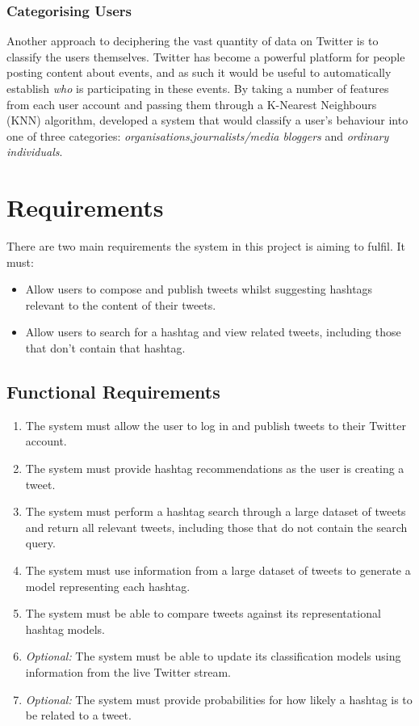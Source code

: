 \documentclass[12pt,a4paper]{article}
\begin{document}
\subsubsection{Categorising Users}
Another approach to deciphering the vast quantity of data on Twitter is to classify the users themselves. Twitter has become a powerful platform for people posting content about events, and as such it would be useful to automatically establish \emph{who} is participating in these events. By taking a number of features from each user account and passing them through a K-Nearest Neighbours (KNN) algorithm, \textcite{DeChoudhury:2012} developed a system that would classify a user's behaviour into one of three categories: \emph{organisations},\emph{journalists/media bloggers} and \emph{ordinary individuals}.

\pagebreak

\section{Requirements}
There are two main requirements the system in this project is aiming to fulfil. It must:
\begin{itemize}
    \item Allow users to compose and publish tweets whilst suggesting hashtags relevant to the content of their tweets.
    \item Allow users to search for a hashtag and view related tweets, including those that don't contain that hashtag.
\end{itemize}

\subsection{Functional Requirements}
\begin{enumerate}
    \item \label{func:publish} The system must allow the user to log in and publish tweets to their Twitter account.
    \item \label{func:suggest} The system must provide hashtag recommendations as the user is creating a tweet.
    \item \label{func:search} The system must perform a hashtag search through a large dataset of tweets and return all relevant tweets, including those that do not contain the search query.
    \item \label{func:genmodel} The system must use information from a large dataset of tweets to generate a model representing each hashtag.
    \item \label{func:compmodels} The system must be able to compare tweets against its representational hashtag models.
    \item \label{func:stream} \emph{Optional:} The system must be able to update its classification models using information from the live Twitter stream.
    \item \label{func:probabilities} \emph{Optional:} The system must provide probabilities for how likely a hashtag is to be related to a tweet.
\end{enumerate}
\end{document}
